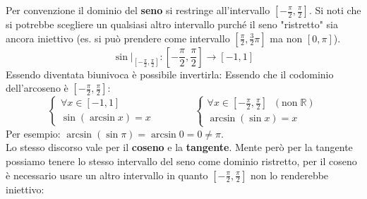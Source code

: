 Per convenzione il dominio del \textbf{seno} si restringe all'intervallo 
$[-\frac{\pi}{2}, \frac{\pi}{2}]$. Si noti che si potrebbe scegliere un 
qualsiasi altro intervallo purché il seno "ristretto" sia ancora iniettivo (es. 
si può prendere come intervallo $[\frac{\pi}{2}, \frac{3}{2}\pi]$ ma non 
$[0, \pi]$).
\begin{equation*}
    \sin |_{[-\frac{\pi}{2}, \frac{\pi}{2}]}: [-\frac{\pi}{2}, \frac{\pi}{2}] 
    \to [-1, 1]
\end{equation*}
Essendo diventata biunivoca è possibile invertirla:
Essendo che il codominio dell'arcoseno è $[-\frac{\pi}{2}, \frac{\pi}{2}]$:
\begin{equation*}
    \begin{cases}
        \forall x \in [-1, 1]\\
        \sin(\arcsin{x}) = x
    \end{cases}
    \qquad \qquad
    \begin{cases}
        \forall x \in [-\frac{\pi}{2}, \frac{\pi}{2}] \;\;(\mathrm{non}\; 
        \mathbb{R})\\
        \arcsin(\sin{x}) = x
    \end{cases}
\end{equation*}
Per esempio: $\arcsin(\sin{\pi}) = \arcsin{0} = 0 \neq \pi$.\\

Lo stesso discorso vale per il \textbf{coseno} e la \textbf{tangente}. Mente 
però per la tangente possiamo tenere lo stesso intervallo del seno come dominio 
ristretto, per il coseno è necessario usare un altro intervallo in quanto 
$[-\frac{\pi}{2}, \frac{\pi}{2}]$ non lo renderebbe iniettivo:

